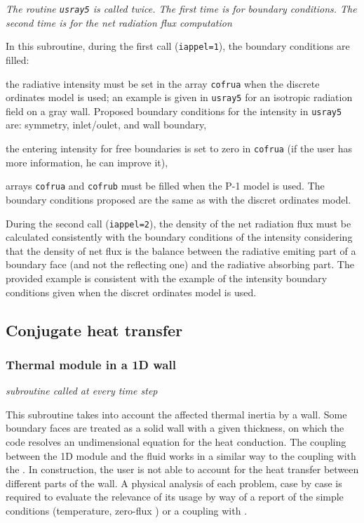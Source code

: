 {{\noindent
\textit{The routine \texttt{usray5} is called twice. The first time is for boundary 
conditions. The second time is for the net radiation flux computation}

In this subroutine, during the first call (\texttt{iappel=1}), the boundary conditions
 are filled:
\begin{list}{-}{}
\item the radiative intensity must be set in the array \texttt{cofrua} when the discrete
 ordinates model is used; an example is given in \texttt{usray5} for an isotropic radiation
 field on a gray wall. Proposed boundary conditions for the intensity in \texttt{usray5} are: 
symmetry, inlet/oulet, and wall boundary,
\item the entering intensity for free boundaries is set to zero in \texttt{cofrua} (if the 
user has more information, he can improve it),
\item arrays \texttt{cofrua} and \texttt{cofrub} must be filled when the P-1 model is
 used. The boundary conditions proposed are the same as with the discret ordinates model.
\end{list}
During the second call (\texttt{iappel=2}), the density of the net radiation flux must be
 calculated consistently with the boundary conditions of the intensity considering that the 
density of net flux is the balance between the radiative emiting part of a boundary face 
(and not the reflecting one) and the radiative absorbing part. The provided example is 
consistent with the example of the intensity boundary conditions given when the discret
 ordinates model is used.


\subsection{Conjugate heat transfer}
\subsubsection{Thermal module in a 1D wall}

\noindent
\textit{subroutine called at every time step}

This subroutine takes into account the affected thermal inertia by a wall.
 Some boundary faces are treated as a solid wall with a given thickness, on
 which the code resolves an undimensional equation for the heat conduction.
 The coupling between the 1D module and the fluid works in a similar way to
 the coupling with the \syrthes. In construction, the user is not able to
 account for the heat transfer between different parts of the wall. A physical
 analysis of each problem, case by case is required to evaluate the relevance
 of its usage by way of a report of the simple conditions (temperature, zero-flux
 ) or a coupling with \syrthes.\\

}}
